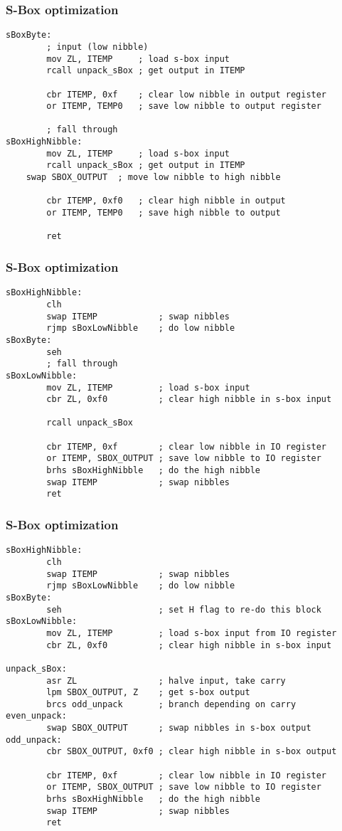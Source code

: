 \documentclass{beamer}
\begin{document}
\begin{frame}[fragile]
\frametitle{S-Box optimization}
\begin{lstlisting}
sBoxByte:
        ; input (low nibble)
        mov ZL, ITEMP     ; load s-box input
        rcall unpack_sBox ; get output in ITEMP

        cbr ITEMP, 0xf    ; clear low nibble in output register
        or ITEMP, TEMP0   ; save low nibble to output register

        ; fall through
sBoxHighNibble:
        mov ZL, ITEMP     ; load s-box input
        rcall unpack_sBox ; get output in ITEMP
	swap SBOX_OUTPUT  ; move low nibble to high nibble

        cbr ITEMP, 0xf0   ; clear high nibble in output
        or ITEMP, TEMP0   ; save high nibble to output

        ret
\end{lstlisting}
\end{frame}

\begin{frame}[fragile]
\frametitle{S-Box optimization}
\begin{lstlisting}
sBoxHighNibble:
        clh
        swap ITEMP            ; swap nibbles
        rjmp sBoxLowNibble    ; do low nibble
sBoxByte:
        seh
        ; fall through
sBoxLowNibble:
        mov ZL, ITEMP         ; load s-box input
        cbr ZL, 0xf0          ; clear high nibble in s-box input

        rcall unpack_sBox

        cbr ITEMP, 0xf        ; clear low nibble in IO register
        or ITEMP, SBOX_OUTPUT ; save low nibble to IO register
        brhs sBoxHighNibble   ; do the high nibble
        swap ITEMP            ; swap nibbles
        ret
\end{lstlisting}
\end{frame}

\begin{frame}[fragile]
\frametitle{S-Box optimization}
\begin{lstlisting}
sBoxHighNibble:
        clh
        swap ITEMP            ; swap nibbles
        rjmp sBoxLowNibble    ; do low nibble
sBoxByte:
        seh                   ; set H flag to re-do this block
sBoxLowNibble:
        mov ZL, ITEMP         ; load s-box input from IO register
        cbr ZL, 0xf0          ; clear high nibble in s-box input

unpack_sBox:
        asr ZL                ; halve input, take carry
        lpm SBOX_OUTPUT, Z    ; get s-box output
        brcs odd_unpack       ; branch depending on carry
even_unpack:
        swap SBOX_OUTPUT      ; swap nibbles in s-box output
odd_unpack:
        cbr SBOX_OUTPUT, 0xf0 ; clear high nibble in s-box output

        cbr ITEMP, 0xf        ; clear low nibble in IO register
        or ITEMP, SBOX_OUTPUT ; save low nibble to IO register
        brhs sBoxHighNibble   ; do the high nibble
        swap ITEMP            ; swap nibbles
        ret
\end{lstlisting}
\end{frame}
\end{document}
